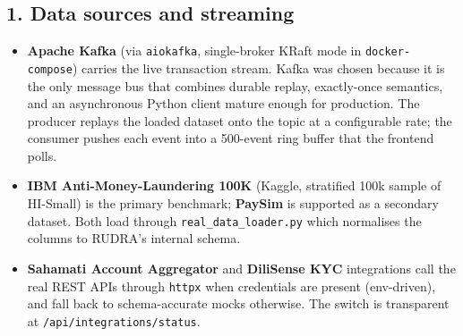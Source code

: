 \documentclass[10pt,a4paper]{article}
\begin{document}
\subsection*{1. Data sources and streaming}
\begin{itemize}
  \item \textbf{Apache Kafka} (via \texttt{aiokafka}, single-broker KRaft mode in \texttt{docker-compose}) carries the live transaction stream. Kafka was chosen because it is the only message bus that combines durable replay, exactly-once semantics, and an asynchronous Python client mature enough for production. The producer replays the loaded dataset onto the topic at a configurable rate; the consumer pushes each event into a 500-event ring buffer that the frontend polls.
  \item \textbf{IBM Anti-Money-Laundering 100K} (Kaggle, stratified 100k sample of HI-Small) is the primary benchmark; \textbf{PaySim} is supported as a secondary dataset. Both load through \texttt{real\_data\_loader.py} which normalises the columns to RUDRA's internal schema.
  \item \textbf{Sahamati Account Aggregator} and \textbf{DiliSense KYC} integrations call the real REST APIs through \texttt{httpx} when credentials are present (env-driven), and fall back to schema-accurate mocks otherwise. The switch is transparent at \texttt{/api/integrations/status}.
\end{itemize}
\end{document}
